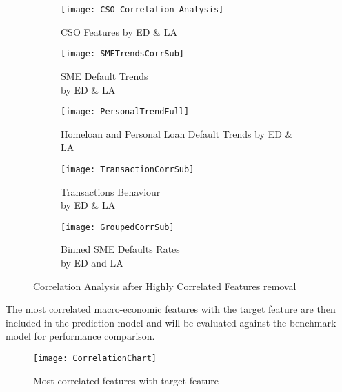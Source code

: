 \begin{figure}[H]
	\begin{adjustwidth}{-2cm}{-2cm}
	\centering
	\begin{subfigure}[b]{0.6\textwidth}
		\captionsetup{font=scriptsize}
		\texttt{[image: CSO\_Correlation\_Analysis]}
		\caption{CSO Features by ED \& LA\\}
		\label{fig:CSOCorrelation}
	\end{subfigure}
	\begin{subfigure}[b]{0.6\textwidth}
		\captionsetup{font=scriptsize}
		\texttt{[image: SMETrendsCorrSub]}
		\caption{SME Default Trends \\by ED \& LA}\label{fig:SMETrendsCorrSub}
	\end{subfigure} 
			\medskip
	\begin{subfigure}[b]{0.6\textwidth}
		\captionsetup{font=scriptsize}
		\texttt{[image: PersonalTrendFull]}
		\caption{Homeloan and Personal Loan Default Trends by ED \& LA}
		\label{fig:PersonalTrendFull}
	\end{subfigure} 
	\begin{subfigure}[b]{0.6\textwidth}
		\captionsetup{font=scriptsize}
		\texttt{[image: TransactionCorrSub]}
		\caption{Transactions Behaviour \\by ED \& LA }\label{fig:TransactionCorrSub}
	\end{subfigure}
		\medskip
	\begin{subfigure}[b]{0.6\textwidth}
		\captionsetup{font=scriptsize}
		\texttt{[image: GroupedCorrSub]}
		\caption{Binned SME Defaults Rates \\by ED and LA\\}
		\label{fig:GroupedCorrSub}
	\end{subfigure}
	\caption{Correlation Analysis after Highly Correlated Features removal}
	\label{fig:unbal_corr_analysis_filtered}
	\end{adjustwidth}
\end{figure}

The most correlated macro-economic features with the target feature are then included in the prediction model and will be evaluated against the benchmark model for performance comparison. 
\begin{figure}[H]
	\texttt{[image: CorrelationChart]}
	\caption{Most correlated features with target feature}
	\label{fig:Correlation Analysis}
\end{figure}


